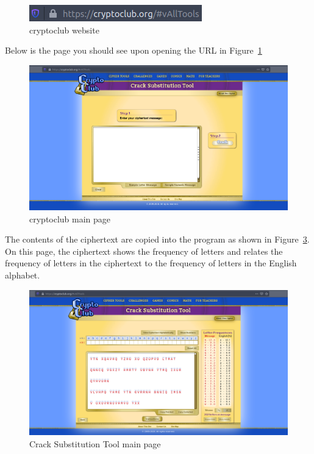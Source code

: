 \documentclass[12pt]{article}
\begin{document}
\begin{figure}[!ht]
    \begin{center}
        \includegraphics[scale=0.65]{c0.1.png}
    \end{center}{}
    \caption{cryptoclub website}
    \label{fig:c0.1}
\end{figure}

\clearpage

Below is the page you should see upon opening the URL in Figure~\ref{fig:c0.1}

\begin{figure}[!ht]
    \begin{center}
        \includegraphics[scale=0.3]{c1.png}
    \end{center}{}
    \caption{cryptoclub main page}
    \label{fig:c1}
\end{figure}


The contents of the ciphertext are copied into the program as shown in Figure~\ref{fig:c3}. On this page, the ciphertext shows the frequency of letters and relates the frequency of letters in the ciphertext to the frequency of letters in the English alphabet.


\begin{figure}[!ht]
    \begin{center}
        \includegraphics[scale=0.3]{c3.png}
    \end{center}{}
    \caption{Crack Substitution Tool main page}
    \label{fig:c3}
\end{figure}
\end{document}
